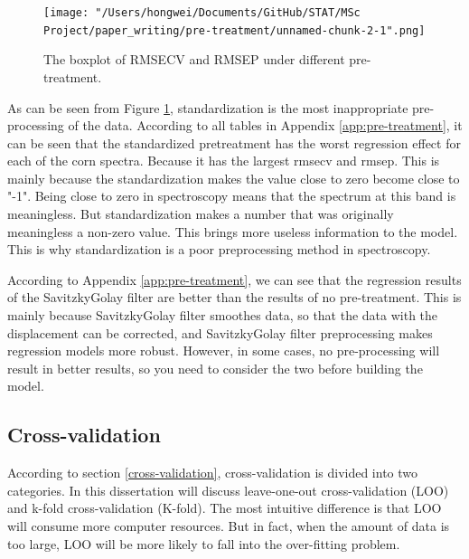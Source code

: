 \documentclass[a4paper,12pt,titlepage]{article} %
\numberwithin{equation}{section}  %
\begin{document}
			\begin{figure}[h]    %
	\centering           %

	\texttt{[image: "/Users/hongwei/Documents/GitHub/STAT/MSc Project/paper\_writing/pre-treatment/unnamed-chunk-2-1".png]}  %
	\caption{The boxplot of RMSECV and RMSEP under different pre-treatment.}          %
	\label{fig:pre-treatment-1-1}               %
\end{figure}                        %
	
	As can be seen from Figure \ref{fig:pre-treatment-1-1}, standardization is the most inappropriate pre-processing of the data. According to all tables in Appendix \ref{app:pre-treatment}, it can be seen that the standardized pretreatment has the worst regression effect for each of the corn spectra.
	Because it has the largest rmsecv and rmsep. This is mainly because the standardization makes the value close to zero become close to "-1". Being close to zero in spectroscopy means that the spectrum at this band is meaningless. But standardization makes a number that was originally meaningless a non-zero value. This brings more useless information to the model. This is why standardization is a poor preprocessing method in spectroscopy.
	
	According to Appendix \ref{app:pre-treatment}, we can see that the regression results of the SavitzkyGolay filter are better than the results of no pre-treatment. This is mainly because SavitzkyGolay filter smoothes data, so that the data with the displacement can be corrected, and SavitzkyGolay filter preprocessing makes  regression models more robust. However, in some cases, no pre-processing will result in better results, so you need to consider the two before building the model.
	
	
	
	\subsection{Cross-validation}
	\label{sec:Cross-Validation}
	
	According to section \ref{cross-validation}, cross-validation is divided into two categories. In this dissertation will discuss leave-one-out cross-validation (LOO) and k-fold cross-validation (K-fold). The most intuitive difference is that LOO will consume more computer resources. But in fact, when the amount of data is too large, LOO will be more likely to fall into the over-fitting problem.
	
\end{document}
